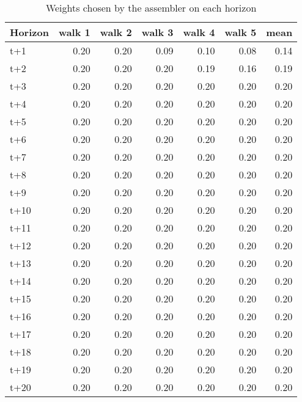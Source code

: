 \begin{table}[H]
\centering
\caption{Weights chosen by the assembler on each horizon}
\label{tab:weights_assembler}
\begin{tabular}{lrrrrrr}
\toprule
Horizon &  walk 1 &  walk 2 &  walk 3 &  walk 4 &  walk 5 &  mean \\
\midrule
t+1  &    0.20 &    0.20 &    0.09 &    0.10 &    0.08 &  0.14 \\
t+2  &    0.20 &    0.20 &    0.20 &    0.19 &    0.16 &  0.19 \\
t+3  &    0.20 &    0.20 &    0.20 &    0.20 &    0.20 &  0.20 \\
t+4  &    0.20 &    0.20 &    0.20 &    0.20 &    0.20 &  0.20 \\
t+5  &    0.20 &    0.20 &    0.20 &    0.20 &    0.20 &  0.20 \\
t+6  &    0.20 &    0.20 &    0.20 &    0.20 &    0.20 &  0.20 \\
t+7  &    0.20 &    0.20 &    0.20 &    0.20 &    0.20 &  0.20 \\
t+8  &    0.20 &    0.20 &    0.20 &    0.20 &    0.20 &  0.20 \\
t+9  &    0.20 &    0.20 &    0.20 &    0.20 &    0.20 &  0.20 \\
t+10 &    0.20 &    0.20 &    0.20 &    0.20 &    0.20 &  0.20 \\
t+11 &    0.20 &    0.20 &    0.20 &    0.20 &    0.20 &  0.20 \\
t+12 &    0.20 &    0.20 &    0.20 &    0.20 &    0.20 &  0.20 \\
t+13 &    0.20 &    0.20 &    0.20 &    0.20 &    0.20 &  0.20 \\
t+14 &    0.20 &    0.20 &    0.20 &    0.20 &    0.20 &  0.20 \\
t+15 &    0.20 &    0.20 &    0.20 &    0.20 &    0.20 &  0.20 \\
t+16 &    0.20 &    0.20 &    0.20 &    0.20 &    0.20 &  0.20 \\
t+17 &    0.20 &    0.20 &    0.20 &    0.20 &    0.20 &  0.20 \\
t+18 &    0.20 &    0.20 &    0.20 &    0.20 &    0.20 &  0.20 \\
t+19 &    0.20 &    0.20 &    0.20 &    0.20 &    0.20 &  0.20 \\
t+20 &    0.20 &    0.20 &    0.20 &    0.20 &    0.20 &  0.20 \\
\bottomrule
\end{tabular}
\end{table}
